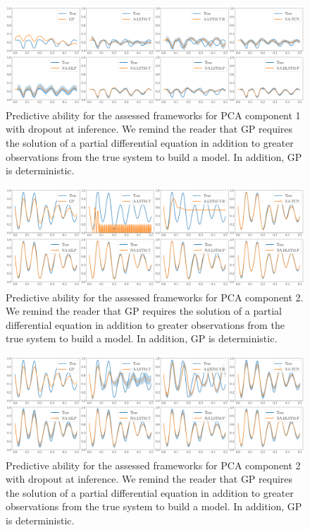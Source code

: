 \documentclass[12pt]{article}
\begin{document}
\begin{figure}[h!]
    \centering
    \includegraphics[width=\textwidth]{Figure_1_do.png}
    \caption{Predictive ability for the assessed frameworks for PCA component 1 with dropout at inference. We remind the reader that GP requires the solution of a partial differential equation in addition to greater observations from the true system to build a model. In addition, GP is deterministic.}
    \label{Mode_1_do}
\end{figure}

\begin{figure}[h!]
    \centering
    \includegraphics[width=\textwidth]{Figure_2.png}
    \caption{Predictive ability for the assessed frameworks for PCA component 2. We remind the reader that GP requires the solution of a partial differential equation in addition to greater observations from the true system to build a model. In addition, GP is deterministic.}
    \label{Mode_2}
\end{figure}

\begin{figure}[h!]
    \centering
    \includegraphics[width=\textwidth]{Figure_2_do.png}
    \caption{Predictive ability for the assessed frameworks for PCA component 2 with dropout at inference. We remind the reader that GP requires the solution of a partial differential equation in addition to greater observations from the true system to build a model. In addition, GP is deterministic.}
    \label{Mode_2_do}
\end{figure}
\end{document}
